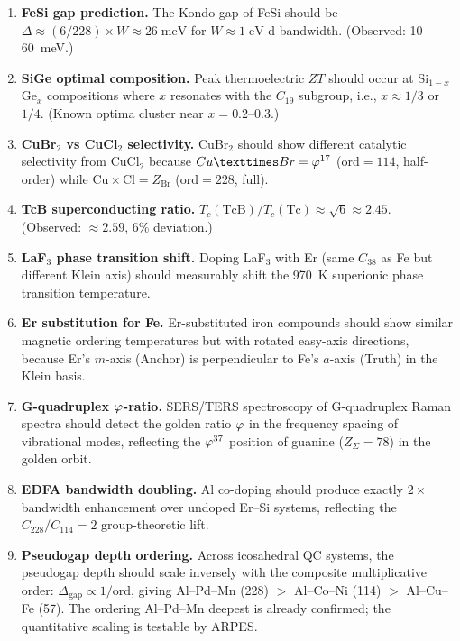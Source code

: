 \begin{enumerate}
  \item \textbf{FeSi gap prediction.} The Kondo gap of FeSi should be $\Delta \approx (6/228) \times W \approx 26\;\mathrm{meV}$ for $W \approx 1\;\mathrm{eV}$ d-bandwidth.  (Observed: 10--60~meV.)

  \item \textbf{SiGe optimal composition.} Peak thermoelectric $ZT$ should occur at Si$_{1-x}$Ge$_x$ compositions where $x$ resonates with the $C_{19}$ subgroup, i.e., $x \approx 1/3$ or $1/4$.  (Known optima cluster near $x = 0.2$--$0.3$.)

  \item \textbf{CuBr$_2$ vs CuCl$_2$ selectivity.} CuBr$_2$ should show different catalytic selectivity from CuCl$_2$ because $\mathrm{Cu} \times \mathrm{Br} = \vp^{17}$ ($\mathrm{ord} = 114$, half-order) while $\mathrm{Cu} \times \mathrm{Cl} = Z_{\mathrm{Br}}$ ($\mathrm{ord} = 228$, full).

  \item \textbf{TcB superconducting ratio.} $T_c(\mathrm{TcB})/T_c(\mathrm{Tc}) \approx \sqrt{6} \approx 2.45$.  (Observed: $\approx 2.59$, 6\% deviation.)

  \item \textbf{LaF$_3$ phase transition shift.} Doping LaF$_3$ with Er (same $C_{38}$ as Fe but different Klein axis) should measurably shift the 970~K superionic phase transition temperature.

  \item \textbf{Er substitution for Fe.} Er-substituted iron compounds should show similar magnetic ordering temperatures but with rotated easy-axis directions, because Er's $m$-axis (Anchor) is perpendicular to Fe's $a$-axis (Truth) in the Klein basis.

  \item \textbf{G-quadruplex $\varphi$-ratio.} SERS/TERS spectroscopy of G-quadruplex Raman spectra should detect the golden ratio $\varphi$ in the frequency spacing of vibrational modes, reflecting the $\varphi^{37}$ position of guanine ($Z_\Sigma = 78$) in the golden orbit.

  \item \textbf{EDFA bandwidth doubling.} Al co-doping should produce exactly $2\times$ bandwidth enhancement over undoped Er--Si systems, reflecting the $C_{228}/C_{114} = 2$ group-theoretic lift.

  \item \textbf{Pseudogap depth ordering.} Across icosahedral QC systems, the pseudogap depth should scale inversely with the composite multiplicative order: $\Delta_{\mathrm{gap}} \propto 1/\mathrm{ord}$, giving Al--Pd--Mn (228) $>$ Al--Co--Ni (114) $>$ Al--Cu--Fe (57).  The ordering Al--Pd--Mn deepest is already confirmed; the quantitative scaling is testable by ARPES.


\end{enumerate}
